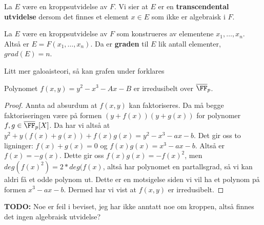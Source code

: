\begin{definisjon}
La $E$ være en kroppsutvidelse av $F$. Vi sier at $E$ er en \textbf{transcendental utvidelse} dersom det finnes et element $x \in E$ som ikke er algebraisk i $F$.
\end{definisjon}

\begin{definisjon}
La $E$ være en kroppsutvidelse av $F$ som konstrueres av elementene $x_1, \ldots, x_n$. Altså er $E = F(x_1, \ldots, x_n)$. Da er \textbf{graden} til $E$ lik antall elementer, $grad(E) = n$.
\end{definisjon}

Litt mer galoaisteori, så kan grafen under forklares 




\begin{eksempel}
Polynomet $f(x,y) = y^2 - x^3 - Ax - B$ er irredusibelt over $\overline{\FF}_p$. 
\label{Elliptisk Kurve polynom}
\begin{proof}
Annta ad absurdum at $f(x,y)$ kan faktoriseres. Da må begge faktoriseringen være på formen $(y + f(x))(y + g(x))$ for polynomer $f,g \in \overline{\FF}_p[X]$. Da har vi altså at $y^2 + y(f(x) + g(x)) + f(x)g(x) = y^2 - x^3 - ax - b$. Det gir oss to ligninger: $f(x) + g(x) = 0$ og $f(x)g(x) = x^3 - ax - b$. Altså er $f(x) = -g(x)$. Dette gir oss $f(x)g(x) = -f(x)^2$, men $deg(f(x)^2) = 2*deg(f(x)$, altså har polynomet en partallsgrad, så vi kan aldri få et odde polynom ut. Dette er en motsigelse siden vi vil ha et polynom på formen $x^3 - ax - b$. Dermed har vi vist at $f(x,y)$ er irredusibelt.
\end{proof}

\textbf{TODO:} Noe er feil i beviset, jeg har ikke anntatt noe om kroppen, altså finnes det ingen algebraisk utvidelse?
\end{eksempel}
